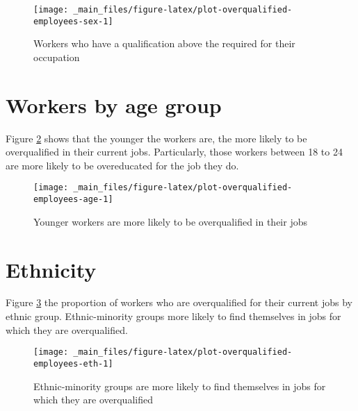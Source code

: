 \documentclass[
]{book}
\begin{document}
\begin{figure}

{\centering \texttt{[image: \_main\_files/figure-latex/plot-overqualified-employees-sex-1]} 

}

\caption{Workers who have a qualification above the required for their occupation}\label{fig:plot-overqualified-employees-sex}
\end{figure}

\hypertarget{workers-by-age-group-3}{%
\section{Workers by age group}\label{workers-by-age-group-3}}

Figure \ref{fig:plot-overqualified-employees-age} shows that the younger the workers are, the more likely to be overqualified in their current jobs. Particularly, those workers between 18 to 24 are more likely to be overeducated for the job they do.

\begin{figure}

{\centering \texttt{[image: \_main\_files/figure-latex/plot-overqualified-employees-age-1]} 

}

\caption{Younger workers are more likely to be overqualified in their jobs}\label{fig:plot-overqualified-employees-age}
\end{figure}

\hypertarget{ethnicity-3}{%
\section{Ethnicity}\label{ethnicity-3}}

Figure \ref{fig:plot-overqualified-employees-eth} the proportion of workers who are overqualified for their current jobs by ethnic group. Ethnic-minority groups more likely to find themselves in jobs for which they are overqualified.

\begin{figure}

{\centering \texttt{[image: \_main\_files/figure-latex/plot-overqualified-employees-eth-1]} 

}

\caption{Ethnic-minority groups are more likely to find themselves in jobs for which they are overqualified}\label{fig:plot-overqualified-employees-eth}
\end{figure}
\end{document}
